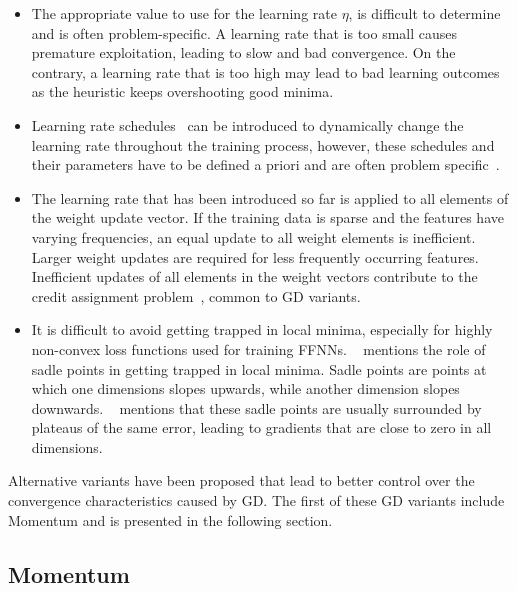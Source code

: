 \begin{itemize}
      \item The appropriate value to use for the learning rate $\eta$, is difficult to determine and is often problem-specific. A learning rate that is too small causes premature exploitation, leading to slow and bad convergence. On the contrary, a learning rate that is too high may lead to bad learning outcomes as the heuristic keeps overshooting good minima.

      \item Learning rate schedules~\cite{ref:robbins:1951} can be introduced to dynamically change the learning rate throughout the training process, however, these schedules and their parameters have to be defined a priori and are often problem specific~\cite{ref:darken:1992}.

      \item The learning rate that has been introduced so far is applied to all elements of the weight update vector. If the training data is sparse and the features have varying frequencies, an equal update to all weight elements is inefficient. Larger weight updates are required for less frequently occurring features. Inefficient updates of all elements in the weight vectors contribute to the credit assignment problem~\cite{ref:rumelhart:1986}, common to \acs{GD} variants.

      \item It is difficult to avoid getting trapped in local minima, especially for highly non-convex loss functions used for training \acp{FFNN}. \citeauthor{ref:dauphin:2014}~\cite{ref:dauphin:2014} mentions the role of sadle points in getting trapped in local minima. Sadle points are points at which one dimensions slopes upwards, while another dimension slopes downwards. \citeauthor{ref:ruder:2016}~\cite{ref:ruder:2016} mentions that these sadle points are usually surrounded by plateaus of the same error, leading to gradients that are close to zero in all dimensions.
\end{itemize}

\noindent
Alternative variants have been proposed that lead to better control over the convergence characteristics caused by \acs{GD}. The first of these \acs{GD} variants include \acs{Momentum} and is presented in the following section.

\subsection{Momentum}\label{sec:heuristics:gd:momentum}

